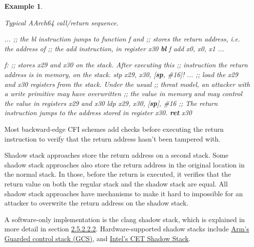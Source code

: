 \documentclass[
  a4paper,
]{report}
\newtheorem{example}{Example}
\newenvironment{Shaded}{}{}
\newcommand{\CommentTok}[1]{\textcolor[rgb]{0.38,0.63,0.69}{\textit{#1}}}
\newcommand{\FunctionTok}[1]{\textcolor[rgb]{0.02,0.16,0.49}{#1}}
\newcommand{\KeywordTok}[1]{\textcolor[rgb]{0.00,0.44,0.13}{\textbf{#1}}}
\newcommand{\NormalTok}[1]{#1}
\newcommand{\OperatorTok}[1]{\textcolor[rgb]{0.40,0.40,0.40}{#1}}
\begin{document}
\begin{example}

\label{}

\textup{Typical AArch64 call/return sequence.}

\begin{Shaded}
\begin{Highlighting}[]
\NormalTok{  ...}
  \CommentTok{;; the bl instruction jumps to function f and}
  \CommentTok{;; stores the return address, i.e. the address of}
  \CommentTok{;; the \textquotesingle{}add\textquotesingle{} instruction, in register x30}
  \KeywordTok{bl}\NormalTok{ f}
\NormalTok{  add x0}\OperatorTok{,}\NormalTok{ x0}\OperatorTok{,}\NormalTok{ x1}
\NormalTok{  ...}

\FunctionTok{f:}
  \CommentTok{;; stores x29 and x30 on the stack. After executing this}
  \CommentTok{;; instruction the return address is in memory, on the stack.}
\NormalTok{  stp x29}\OperatorTok{,}\NormalTok{ x30}\OperatorTok{,} \OperatorTok{[}\KeywordTok{sp}\OperatorTok{,} \CommentTok{\#16]!}
\NormalTok{  ...}
  \CommentTok{;; load the x29 and x30 registers from the stack. Under the usual}
  \CommentTok{;; threat model, an attacker with a write primitive may have overwritten}
  \CommentTok{;; the value in memory and may control the value in registers x29 and x30}
\NormalTok{  ldp x29}\OperatorTok{,}\NormalTok{ x30}\OperatorTok{,} \OperatorTok{[}\KeywordTok{sp}\OperatorTok{],} \CommentTok{\#16}
  \CommentTok{;; The return instruction jumps to the address stored in register x30.}
  \KeywordTok{ret}\NormalTok{ x30}
\end{Highlighting}
\end{Shaded}

\end{example}

Most backward-edge CFI schemes add checks before executing the return
instruction to verify that the return address hasn't been tampered with.

Shadow stack approaches store the return address on
a second stack. Some shadow stack approaches also store the return
address in the original location in the normal stack. In those, before
the return is executed, it verifies that the return value on both the
regular stack and the shadow stack are equal. All shadow stack
approaches have mechanisms to make it hard to impossible for an attacker
to overwrite the return address on the shadow stack.

A software-only implementation is the clang shadow stack, which is
explained in more detail in section
\hyperref[sec:clang-shadow-stack]{2.5.2.2.2}. Hardware-supported shadow
stacks include
\href{https://community.arm.com/arm-community-blogs/b/architectures-and-processors-blog/posts/arm-a-profile-architecture-2022}{Arm's
Guarded control stack (GCS)}, and
\href{https://www.intel.com/content/www/us/en/content-details/785687/complex-shadow-stack-updates-intel-control-flow-enforcement-technology.html}{Intel's
CET Shadow Stack}.
\end{document}
